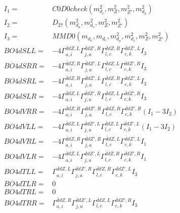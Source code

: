\documentclass[A4,landscape]{article}
\begin{document}
\begin{align} 
I_1 = & C0D0check(m^2_{d_{{c}}}, m^2_{Z}, m^2_{{Z'}}, m^2_{d_{{a}}}) \\ 
I_2 = & D_{27}(m^2_{d_{{a}}}, m^2_{d_{{c}}}, m^2_{Z}, m^2_{{Z'}}) \\ 
I_3 = & MMD0(m_{d_{{a}}}, m_{d_{{c}}}, m^2_{d_{{a}}}, m^2_{d_{{c}}}, m^2_{Z}, m^2_{{Z'}}) \\ 
  BO4dSLL= & -4  \Gamma^{\bar{d}d Z ,L}_{a, i} \Gamma^{\bar{d}d {Z'} ,R}_{j, a} \Gamma^{\bar{d}d Z ,R}_{l, c} \Gamma^{\bar{d}d {Z'} ,L}_{c, k} I_3 \\ 
  BO4dSRR= & -4  \Gamma^{\bar{d}d Z ,R}_{a, i} \Gamma^{\bar{d}d {Z'} ,L}_{j, a} \Gamma^{\bar{d}d Z ,L}_{l, c} \Gamma^{\bar{d}d {Z'} ,R}_{c, k} I_3 \\ 
  BO4dSRL= & -4  \Gamma^{\bar{d}d Z ,R}_{a, i} \Gamma^{\bar{d}d {Z'} ,L}_{j, a} \Gamma^{\bar{d}d Z ,R}_{l, c} \Gamma^{\bar{d}d {Z'} ,L}_{c, k} I_3 \\ 
  BO4dSLR= & -4  \Gamma^{\bar{d}d Z ,L}_{a, i} \Gamma^{\bar{d}d {Z'} ,R}_{j, a} \Gamma^{\bar{d}d Z ,L}_{l, c} \Gamma^{\bar{d}d {Z'} ,R}_{c, k} I_3 \\ 
  BO4dVRR= & -4  \Gamma^{\bar{d}d Z ,R}_{a, i} \Gamma^{\bar{d}d {Z'} ,R}_{j, a} \Gamma^{\bar{d}d Z ,R}_{l, c} \Gamma^{\bar{d}d {Z'} ,R}_{c, k} (I_1 - 3 I_2) \\ 
  BO4dVLL= & -4  \Gamma^{\bar{d}d Z ,L}_{a, i} \Gamma^{\bar{d}d {Z'} ,L}_{j, a} \Gamma^{\bar{d}d Z ,L}_{l, c} \Gamma^{\bar{d}d {Z'} ,L}_{c, k} (I_1 - 3 I_2) \\ 
  BO4dVRL= & -4  \Gamma^{\bar{d}d Z ,R}_{a, i} \Gamma^{\bar{d}d {Z'} ,R}_{j, a} \Gamma^{\bar{d}d Z ,L}_{l, c} \Gamma^{\bar{d}d {Z'} ,L}_{c, k} I_1 \\ 
  BO4dVLR= & -4  \Gamma^{\bar{d}d Z ,L}_{a, i} \Gamma^{\bar{d}d {Z'} ,L}_{j, a} \Gamma^{\bar{d}d Z ,R}_{l, c} \Gamma^{\bar{d}d {Z'} ,R}_{c, k} I_1 \\ 
  BO4dTLL= &  \Gamma^{\bar{d}d Z ,L}_{a, i} \Gamma^{\bar{d}d {Z'} ,R}_{j, a} \Gamma^{\bar{d}d Z ,R}_{l, c} \Gamma^{\bar{d}d {Z'} ,L}_{c, k} I_3 \\ 
  BO4dTLR= & 0 \\ 
  BO4dTRL= & 0 \\ 
  BO4dTRR= &  \Gamma^{\bar{d}d Z ,R}_{a, i} \Gamma^{\bar{d}d {Z'} ,L}_{j, a} \Gamma^{\bar{d}d Z ,L}_{l, c} \Gamma^{\bar{d}d {Z'} ,R}_{c, k} I_3 \\ 
\end{align} 
\end{document}
